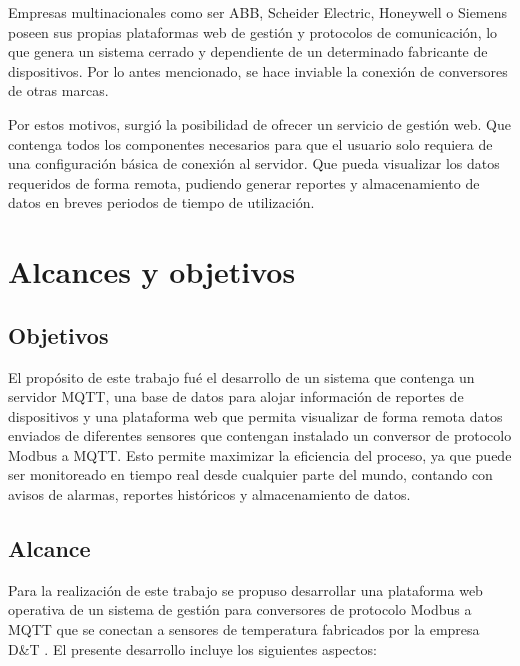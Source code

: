 Empresas multinacionales como ser ABB, Scheider Electric, Honeywell o Siemens poseen sus propias plataformas web de gestión y protocolos de comunicación, lo que genera un sistema cerrado y dependiente de un determinado fabricante de dispositivos. Por lo antes mencionado, se hace inviable la conexión de conversores de otras marcas. 

Por estos motivos, surgió la posibilidad de ofrecer un servicio de gestión web. Que contenga todos los componentes necesarios para que el usuario solo requiera de una configuración básica de conexión al servidor.  Que pueda visualizar los datos requeridos de forma remota, pudiendo generar reportes y almacenamiento de datos en breves periodos de tiempo de utilización. 



\section{Alcances y objetivos}

\subsection{Objetivos}

El propósito de este trabajo fué el desarrollo de un sistema que contenga un servidor MQTT, una base de datos para alojar información de reportes de dispositivos y una plataforma web que permita visualizar de forma remota datos enviados de diferentes sensores que contengan instalado un conversor de protocolo Modbus a MQTT.  Esto permite maximizar la eficiencia del proceso, ya que puede ser monitoreado en tiempo real desde cualquier parte del mundo, contando con avisos de alarmas, reportes históricos y almacenamiento de datos. 

\subsection{Alcance}

Para la realización de este trabajo se propuso desarrollar una plataforma web operativa de un sistema de gestión para conversores de protocolo Modbus a MQTT que se conectan a sensores de temperatura fabricados por la empresa D\&T \citep{WEBSITE:8}.  El presente desarrollo incluye los siguientes aspectos:

